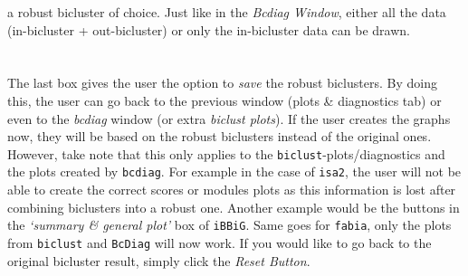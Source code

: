 \documentclass[a4paper]{article}\usepackage[]{graphicx}\usepackage[]{color}
\begin{document}
a robust bicluster of choice. Just like in the {\it Bcdiag Window}, either all
the data (in-bicluster + out-bicluster) or only the in-bicluster data can be
drawn. 
\\ \\
\\
The last box gives the user the option to {\it save} the robust biclusters. By
doing this, the user can go back to the previous window (plots \& diagnostics
tab) or even to the {\it bcdiag} window (or extra {\it biclust plots}). If the user creates the graphs now,
they will be based on the robust biclusters instead of the original ones.
However, take note that this only applies to the
\verb|biclust|-plots/diagnostics and the plots created by \verb|bcdiag|. 
For example in the case of \verb|isa2|, the user will not be able to create the
correct scores or modules plots as this information is lost after combining
biclusters into a robust one. Another example would be the buttons in the {\it
`summary \& general plot'} box of \verb|iBBiG|. Same goes for \verb|fabia|,
only the plots from \verb|biclust| and \verb|BcDiag| will now work. If you would
like to go back to the original bicluster result, simply click the {\it Reset Button}.


\newpage
\end{document}

